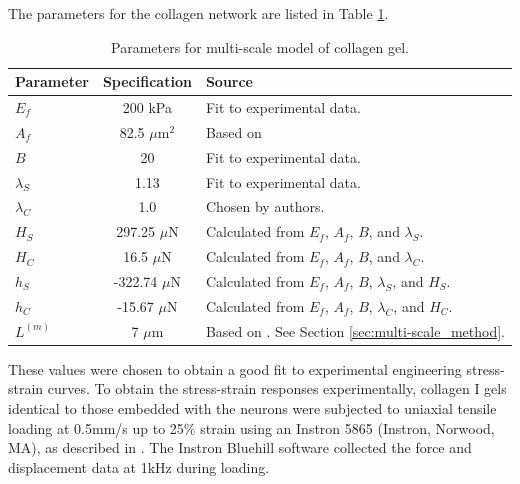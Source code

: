 \documentclass[]{interact}
\begin{document}
The parameters for the collagen network are listed in Table \ref{table:multi-scale_parameters}.
\begin{table}[ht]
\begin{center}
\begin{tabular}{ l c l }
\hline \hline
Parameter & Specification & Source \\
\hline 
$E_f$ & 200 kPa & Fit to experimental data. \\
$A_f$ & 82.5 $\mu$m$^2$ & Based on \cite{Dutov:2016gu} \\
$B$ & 20 & Fit to experimental data. \\
$\lambda_S$ &1.13 & Fit to experimental data. \\
$\lambda_C$ & 1.0 & Chosen by authors. \\ 
$H_S$ & 297.25 $\mu$N & Calculated from $E_f$, $A_f$, $B$, and $\lambda_S$.\\
$H_C$ & 16.5 $\mu$N & Calculated from $E_f$, $A_f$, $B$, and $\lambda_C$. \\
$h_S$ & -322.74 $\mu$N & Calculated from $E_f$, $A_f$, $B$, $\lambda_S$, and $H_S$. \\
$h_C$ & -15.67 $\mu$N & Calculated from $E_f$, $A_f$, $B$, $\lambda_C$, and $H_C$. \\
$L^{(m)}$ & 7 $\mu$m & Based on \cite{Lindstrom:2013gd}. See Section \ref{sec:multi-scale_method}.\\ 
\hline \hline
\end{tabular}
\end{center}
\caption{Parameters for multi-scale model of collagen gel.}
\label{table:multi-scale_parameters}
\end{table}
These values were chosen to obtain a good fit to experimental engineering stress-strain curves. To obtain the stress-strain responses experimentally, collagen I gels identical to those embedded with the neurons were subjected to uniaxial tensile loading at 0.5mm/s up to 25$\%$ strain using an Instron 5865 (Instron, Norwood, MA), as described in  \cite{Zhang:2016ga}. The Instron Bluehill software collected the force and displacement data at 1kHz during loading. 
\end{document}
